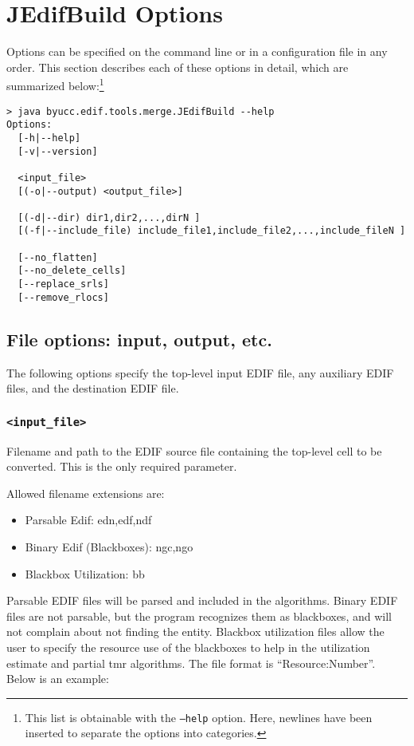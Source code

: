 \section{JEdifBuild Options}
Options can be specified on the command line or in a configuration file in any 
order. This section describes each of these options in detail, which are 
summarized below:\footnote{This list is obtainable with the \texttt{--help} 
option. Here, newlines have been inserted to separate the options into 
categories.}

\begin{verbatim}
> java byucc.edif.tools.merge.JEdifBuild --help
Options:
  [-h|--help]
  [-v|--version]

  <input_file>
  [(-o|--output) <output_file>]

  [(-d|--dir) dir1,dir2,...,dirN ]
  [(-f|--include_file) include_file1,include_file2,...,include_fileN ]

  [--no_flatten]
  [--no_delete_cells]
  [--replace_srls]
  [--remove_rlocs]

\end{verbatim}

\subsection{File options: input, output, etc.}
The following options specify the top-level input EDIF file, any auxiliary EDIF
files, and the destination EDIF file.

\subsubsection{\texttt{<input\_file>}}
Filename and path to the EDIF source file containing the top-level cell to be 
converted. This is the only required parameter.

Allowed filename extensions are:
\begin{itemize}
  \item Parsable Edif: edn,edf,ndf
  \item Binary Edif (Blackboxes): ngc,ngo
  \item Blackbox Utilization: bb
\end{itemize}

Parsable EDIF files will be parsed and included in the algorithms.
Binary EDIF files are not parsable, but the program recognizes them as
blackboxes, and will not complain about not finding the entity.
Blackbox utilization files allow the user to specify the resource use
of the blackboxes to help in the utilization estimate and partial tmr
algorithms.  The file format is ``Resource:Number''.  Below is an
example:

